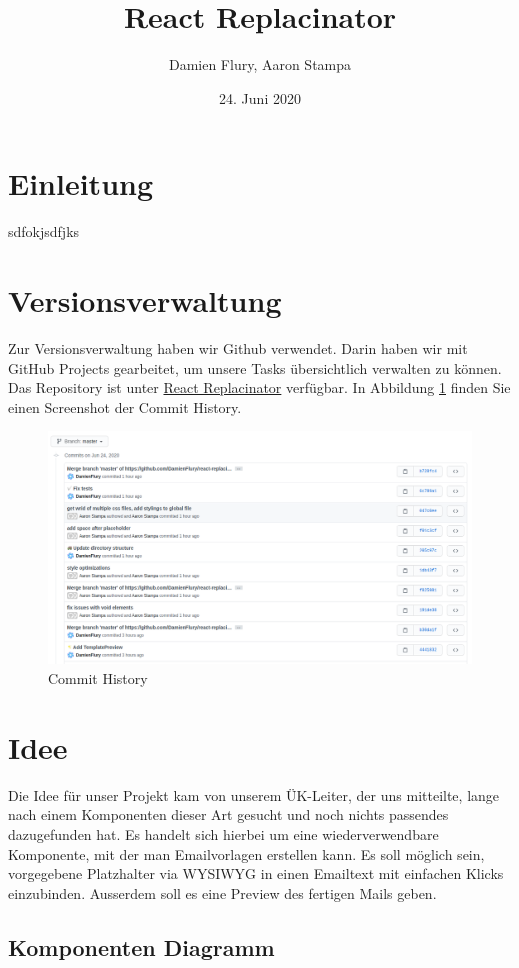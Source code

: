\documentclass[a4paper, titlepage]{article}
\title{React Replacinator}
\author{Damien Flury, Aaron Stampa}
\date{24. Juni 2020}
\begin{document}
  \maketitle
  \tableofcontents
  \newpage
  \section{Einleitung}
  sdfokjsdfjks
  \section{Versionsverwaltung}
  Zur Versionsverwaltung haben wir Github verwendet.
  Darin haben wir mit GitHub Projects gearbeitet,
  um unsere Tasks übersichtlich verwalten zu
  können. Das Repository ist unter 
  \href{https://github.com/DamienFlury/react-replacinator}{React Replacinator}
  verfügbar. In Abbildung \ref{git:commit-history} finden Sie einen Screenshot
  der Commit History.

  \begin{figure}
    \includegraphics[width=\textwidth]{images/commit-history.png}
    \caption{Commit History}
    \label{git:commit-history}
  \end{figure}
  \section{Idee}
  Die Idee für unser Projekt kam von unserem ÜK-Leiter, der uns mitteilte, 
  lange nach einem Komponenten dieser Art gesucht und noch nichts passendes 
  dazugefunden hat. 
  Es handelt sich hierbei um eine wiederverwendbare Komponente, mit der man 
  Emailvorlagen erstellen kann. Es soll möglich sein, vorgegebene Platzhalter 
  via WYSIWYG in einen Emailtext mit einfachen Klicks einzubinden. 
  Ausserdem soll es eine Preview des fertigen Mails geben.
  \subsection{Komponenten Diagramm}
\end{document}
